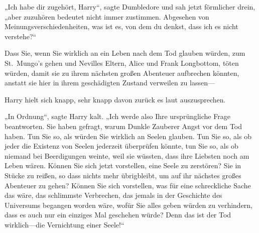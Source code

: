 „Ich habe dir zugehört, Harry“, sagte Dumbledore und sah jetzt förmlicher drein, „aber zuzuhören bedeutet nicht immer zustimmen. Abgesehen von Meinungsverschiedenheiten, was ist es, von dem du denkst, dass ich es nicht verstehe?“

Dass Sie, wenn Sie wirklich an ein Leben nach dem Tod glauben würden, zum St.~Mungo’s gehen und Nevilles Eltern, Alice und Frank Longbottom, töten würden, damit sie zu ihrem nächsten großen Abenteuer aufbrechen könnten, anstatt sie hier in ihrem geschädigten Zustand verweilen zu lassen—

Harry hielt sich knapp, sehr knapp davon zurück es laut auszusprechen.

„In Ordnung“, sagte Harry kalt. „Ich werde also Ihre ursprüngliche Frage beantworten. Sie haben gefragt, warum Dunkle Zauberer Angst vor dem Tod haben. Tun Sie so, als würden Sie wirklich an Seelen glauben. Tun Sie so, als ob jeder die Existenz von Seelen jederzeit überprüfen könnte, tun Sie so, als ob niemand bei Beerdigungen weinte, weil sie wüssten, dass ihre Liebsten noch am Leben wären. Können Sie sich jetzt vorstellen, eine Seele zu zerstören? Sie in Stücke zu reißen, so dass nichts mehr übrigbleibt, um auf ihr nächstes großes Abenteuer zu gehen? Können Sie sich vorstellen, was für eine schreckliche Sache das wäre, das schlimmste Verbrechen, das jemals in der Geschichte des Universums begangen worden wäre, wofür Sie alles geben würden zu verhindern, dass es auch nur ein einziges Mal geschehen würde? Denn das ist der Tod wirklich—die Vernichtung einer Seele!“

